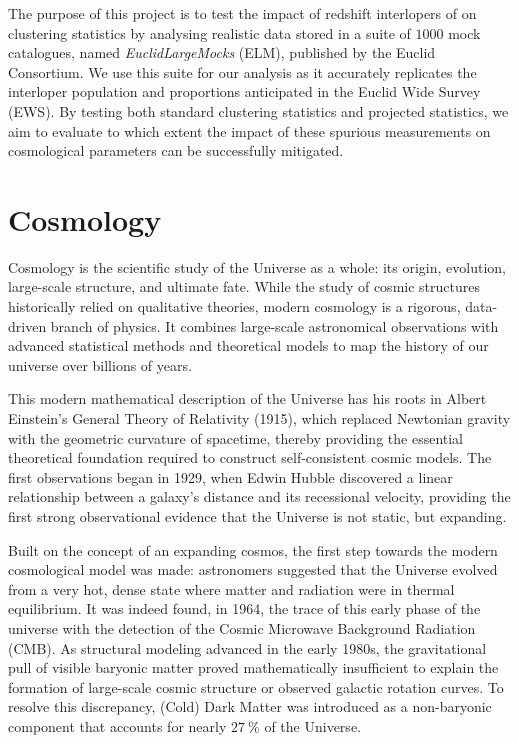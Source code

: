 \documentclass[12pt,a4paper,oneside]{report}
\begin{document}
The purpose of this project is to test the impact of redshift interlopers of on clustering statistics by analysing realistic data stored in a suite of $1000$ mock catalogues, named \textit{EuclidLargeMocks} (ELM), published by the Euclid Consortium. We use this suite for our analysis as it accurately replicates the interloper population and proportions anticipated in the Euclid Wide Survey (EWS). By testing both standard clustering statistics and projected statistics, we aim to evaluate to which extent the impact of these spurious measurements on cosmological parameters can be successfully mitigated.
\newpage

\chapter{Cosmology}\label{chap:Cosmology}
Cosmology is the scientific study of the Universe as a whole: its origin, evolution, large-scale structure, and ultimate fate. While the study of cosmic structures historically relied on qualitative theories, modern cosmology is a rigorous, data-driven branch of physics. It combines large-scale astronomical observations with advanced statistical methods and theoretical models to map the history of our universe over billions of years.

This modern mathematical description of the Universe has his roots in Albert Einstein's General Theory of Relativity (1915), which replaced Newtonian gravity with the geometric curvature of spacetime, thereby providing the essential theoretical foundation required to construct self-consistent cosmic models. The first observations began in 1929, when Edwin Hubble discovered a linear relationship between a galaxy's distance and its recessional velocity, providing the first strong observational evidence that the Universe is not static, but expanding.

Built on the concept of an expanding cosmos, the first step towards the modern cosmological model was made: astronomers suggested that the Universe evolved from a very hot, dense state where matter and radiation were in thermal equilibrium. It was indeed found, in 1964, the trace of this early phase of the universe with the detection of the Cosmic Microwave Background Radiation (CMB). As structural modeling advanced in the early 1980s, the gravitational pull of visible baryonic matter proved mathematically insufficient to explain the formation of large-scale cosmic structure or observed galactic rotation curves. To resolve this discrepancy, (Cold) Dark Matter was introduced as a non-baryonic component that accounts for nearly $\SI{27}{\%}$ of the Universe.
\end{document}

